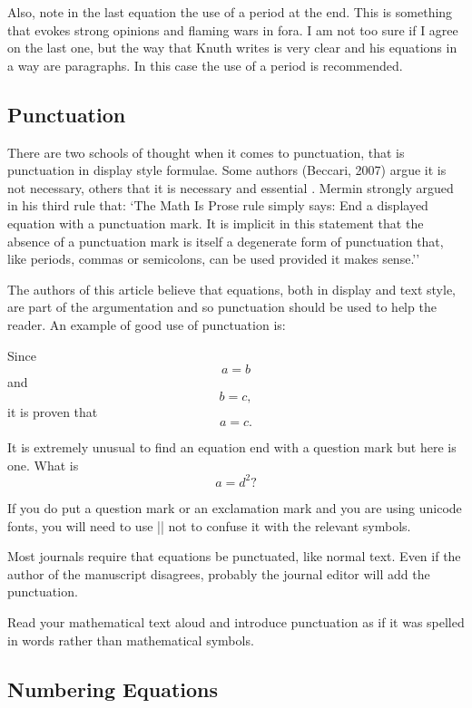 {Also, note in the last equation the use of a period at the end. 
This is something that evokes strong opinions and flaming wars in fora. 
I am not too sure if I agree on the last one, but the way that Knuth writes 
is very clear and his equations in a way are paragraphs. 
In this case the use of a period is recommended.


\subsection{Punctuation}

There are two schools of thought when it comes to punctuation, that is punctuation in display style formulae. Some authors (Beccari, 2007) argue it is not necessary, others that it is necessary and essential \citep{guiggiani2008}. Mermin \citeyearpar{mermin89} strongly argued in his third rule that:  `The
Math Is Prose rule simply says: End
a displayed equation with a punctuation
mark. It is implicit in this
statement that the absence of a punctuation
mark is itself a degenerate
form of punctuation that, like periods,
commas or semicolons, can be used
provided it makes sense.''

The authors of this article believe that equations, both in display and text style, are part of the argumentation
and so punctuation should be used to help the reader. An example of good use of punctuation is:


Since
\[ a=b \]
and
\[ b=c,\]
it is proven that
\[ a =c. \]

It is extremely unusual to find an equation end with a question mark but here is one. What is 
\[ a = d^2\mathrm{?} \]

If you do put a question mark or an exclamation mark and you are using unicode fonts,
you will need to use || not to confuse it with the relevant symbols.

Most journals require that equations be punctuated, like normal text. Even if the author of the manuscript disagrees, probably the journal editor will add the punctuation.

Read your mathematical text aloud and introduce punctuation as if it was spelled in words rather than mathematical symbols. 

\subsection{Numbering Equations}

}
